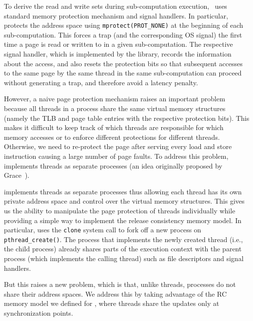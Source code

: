 To derive the read and write sets during sub-computation execution,  \projecttitle~uses standard memory protection  mechanism and signal handlers. In particular, \projecttitle protects the address space using {\tt mprotect(PROT\_NONE)} at the beginning of each sub-computation. This forces a trap (and the corresponding OS signal) the first time a page is read or written to in a given sub-computation. The respective signal handler, which is implemented by the \projecttitle library, records the information about the access, and also resets the protection bits so that subsequent accesses to the same page by the same thread in the same sub-computation can proceed without generating a trap, and therefore avoid a
latency penalty.  

However, a naive page protection mechanism raises an important problem because all threads in a process share the same virtual memory
structures (namely the TLB and page table entries with the respective protection bits). This makes it difficult to keep track of which
threads are responsible for which memory accesses or to enforce different protections for different threads. Otherwise, we need to re-protect the page after serving every load and store instruction causing a large number of page faults.
To address this problem, \projecttitle implements threads as separate
processes (an idea originally proposed by Grace~\cite{grace-oopsla-2009}).

 \projecttitle  implements threads as separate processes thus allowing each thread has its own private address space and control over the virtual
memory structures.   This gives us the ability to manipulate the page protection of threads individually while providing a simple way to implement the release consistency memory
model. In particular, \projecttitle uses the {\tt clone} system call to fork off a new process on {\tt pthread\_create()}. The process that implements the newly created thread (i.e., the child process) already
shares parts of the execution context with the parent process (which implements the calling thread) such as file descriptors and signal handlers. 


But this raises a new problem, which is that, unlike threads, processes do not share their address spaces. We address this by taking advantage of the RC memory model we defined for \projecttitle, where threads share the updates only at synchronization points.  

